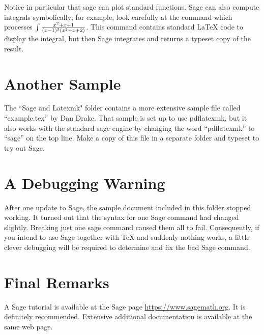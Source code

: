 \documentclass[11pt, oneside]{amsart}
\begin{document}
Notice in particular that sage can plot standard functions. Sage can also compute integrals symbolically; for example, look carefully at the command which processes $\int {{x^2 + x + 1} \over {(x - 1)^3 (x^2 + x + 2)}}$. This command contains standard LaTeX code to display the integral, but then Sage integrates and returns a typeset copy of the result.


%
%
%

\section{Another Sample}

The ``Sage and Latexmk" folder contains a more extensive sample file called ``example.tex'' by Dan Drake. That sample is set up to use pdflatexmk, but it also works with the standard sage engine by changing the word ``pdflatexmk'' to ``sage'' on the top line.
Make a copy of this file in a separate folder and typeset to try out Sage.


\section{A Debugging Warning}

After one update to Sage, the sample document included in this folder stopped working. It turned out that the syntax for one Sage command had changed slightly. Breaking just one sage command caused them all to fail. Consequently, if you intend to use Sage together with TeX and suddenly nothing works, a little clever debugging will be required to determine and fix the bad Sage command.



\section{Final Remarks}
 
A Sage tutorial is available at the Sage page \url{https://www.sagemath.org}. It is definitely recommended. Extensive additional documentation is available at the same web page.
\end{document}
